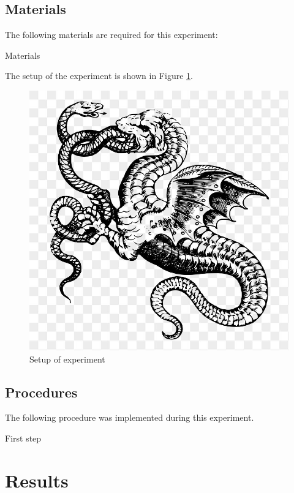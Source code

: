 \documentclass[stu,biblatex,floatsintext,draftall]{apa7}
\begin{document}
\subsection{Materials}
The following materials are required for this experiment:
\begin{APAitemize}
	\item Materials
\end{APAitemize}
The setup of the experiment is shown in Figure \ref{fig:setup}.
\begin{figure}
	\centering
	\caption{Setup of experiment}
	\label{fig:setup}
	\includegraphics{dragon}
\end{figure}

\subsection{Procedures}
The following procedure was implemented during this experiment.
\begin{APAenumerate}
	\item First step
\end{APAenumerate}

\section{Results}
\end{document}

